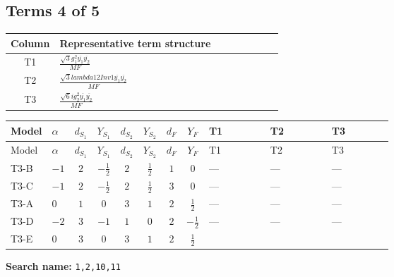 \documentclass[8pt]{article}
\begin{document}
\begin{landscape}
\subsection*{Terms 4 of 5}
\begin{center}
\begin{tabular}{@{}c >{\raggedright\arraybackslash}p{0.82\linewidth}@{}}
\toprule
Column & Representative term structure \\
\midrule
T1 & \(\displaystyle \frac{\sqrt{3} g_{1}^{2} \overline{y_{1}} \overline{y_{2}}}{MF}\) \\
\midrule
T2 & \(\displaystyle \frac{\sqrt{3} lambda12Inv1 \overline{y_{1}} \overline{y_{2}}}{MF}\) \\
\midrule
T3 & \(\displaystyle \frac{\sqrt{6} i g_{2}^{2} \overline{y_{1}} \overline{y_{2}}}{MF}\) \\
\midrule
\bottomrule
\end{tabular}
\end{center}
\smallskip
\tiny
\begin{longtable}{@{}llcccccc >{\raggedright\arraybackslash}p{0.21\linewidth} >{\raggedright\arraybackslash}p{0.21\linewidth} >{\raggedright\arraybackslash}p{0.21\linewidth}@{}}
\toprule
Model & $\alpha$ & $d_{S_1}$ & $Y_{S_1}$ & $d_{S_2}$ & $Y_{S_2}$ & $d_F$ & $Y_F$ & T1 & T2 & T3 \\
\midrule
\endfirsthead
\toprule
Model & $\alpha$ & $d_{S_1}$ & $Y_{S_1}$ & $d_{S_2}$ & $Y_{S_2}$ & $d_F$ & $Y_F$ & T1 & T2 & T3 \\
\midrule
\endhead
T3-B & $-1$ & $2$ & $-\frac{1}{2}$ & $2$ & $\frac{1}{2}$ & $1$ & $0$ & --- & --- & --- \\
\midrule
T3-C & $-1$ & $2$ & $-\frac{1}{2}$ & $2$ & $\frac{1}{2}$ & $3$ & $0$ & --- & --- & --- \\
\midrule
T3-A & $0$ & $1$ & $0$ & $3$ & $1$ & $2$ & $\frac{1}{2}$ & --- & --- & --- \\
\midrule
T3-D & $-2$ & $3$ & $-1$ & $1$ & $0$ & $2$ & $-\frac{1}{2}$ & --- & --- & --- \\
\midrule
T3-E & $0$ & $3$ & $0$ & $3$ & $1$ & $2$ & $\frac{1}{2}$ & \scriptsize\adjustbox{max width=\linewidth}{$\begin{gathered} - \frac{\sqrt{3} g_{1}^{2} \overline{y_{1}} \overline{y_{2}}}{8 MF}\end{gathered}$} & \scriptsize\adjustbox{max width=\linewidth}{$\begin{gathered} \frac{\sqrt{3} lambda12Inv1 \overline{y_{1}} \overline{y_{2}}}{6 MF}\end{gathered}$} & \scriptsize\adjustbox{max width=\linewidth}{$\begin{gathered} \frac{\sqrt{6} i g_{2}^{2} \overline{y_{1}} \overline{y_{2}}}{6 MF}\end{gathered}$} \\
\midrule
\bottomrule
\end{longtable}
\clearpage
\noindent\textbf{Search name: }\texttt{1,2,10,11}\par\smallskip

\end{landscape}
\end{document}

